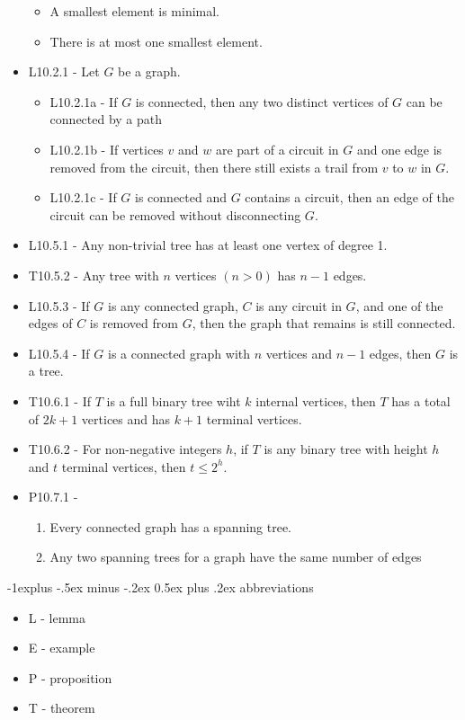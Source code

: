\documentclass[10pt, landscape]{article}
\makeatletter
\renewcommand{\subsection}{\@startsection{subsection}{2}{0mm}%
                                {-1explus -.5ex minus -.2ex}%
                                {0.5ex plus .2ex}%
                                {\normalfont\normalsize\bfseries}}
\makeatother
\begin{document}
\begin{multicols*}{3}
\begin{itemize}
\begin{itemize}
            \item A smallest element is minimal.
            \item There is at most one smallest element.
        \end{itemize}
        \item L10.2.1 - Let $G$ be a graph.
        \begin{itemize}
            \item L10.2.1a - If $G$ is connected, then any two distinct vertices of $G$ can be connected by a path
            \item L10.2.1b - If vertices $v$ and $w$ are part of a circuit in $G$ and one edge is removed from the circuit, then there still exists a trail from $v$ to $w$ in $G$.
            \item L10.2.1c - If $G$ is connected and $G$ contains a circuit, then an edge of the circuit can be removed without disconnecting $G$.
        \end{itemize}
        \item L10.5.1 - Any non-trivial tree has at least one vertex of degree 1.
        \item T10.5.2 - Any tree with $n$ vertices $(n>0)$ has $n-1$ edges.
        \item L10.5.3 - If $G$ is any connected graph, $C$ is any circuit in $G$, and one of the edges of $C$ is removed from $G$, then the graph that remains is still connected.
        \item L10.5.4 - If $G$ is a connected graph with $n$ vertices and $n-1$ edges, then $G$ is a tree.
        \item T10.6.1 - If $T$ is a full binary tree wiht $k$ internal vertices, then $T$ has a total of $2k + 1$ vertices and has $k+1$ terminal vertices.
        \item T10.6.2 - For non-negative integers $h$, if $T$ is any binary tree with height $h$ and $t$ terminal vertices, then $t \leq 2^h$.
        \item P10.7.1 - 
        \begin{enumerate}
            \item Every connected graph has a spanning tree.
            \item Any two spanning trees for a graph have the same number of edges
        \end{enumerate} 
    \end{itemize}

    \subsection{abbreviations}
    \begin{itemize}
        \item L - lemma
        \item E - example
        \item P - proposition
        \item T - theorem
    \end{itemize}
\end{multicols*}
\end{document}
